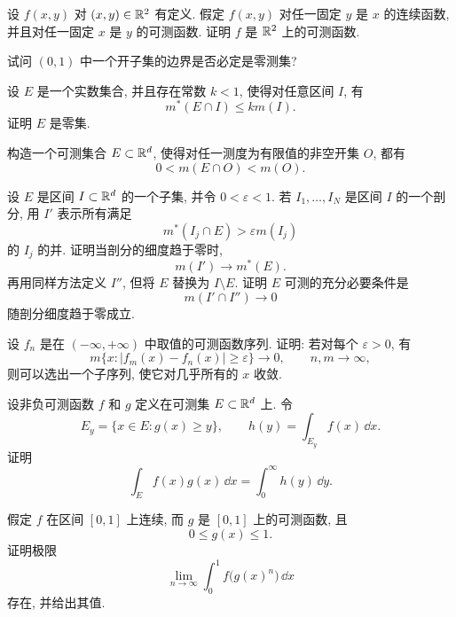 \begin{exer}
	设 \(f(x,y)\) 对 \((x,y)\in\mathbb{R}^2\) 有定义. 假定 \(f(x,y)\) 对任一固定 \(y\) 是 \(x\) 的连续函数, 并且对任一固定 \(x\) 是 \(y\) 的可测函数. 证明 \(f\) 是 \(\mathbb{R}^2\) 上的可测函数.
\end{exer}

\begin{exer}
	试问 \((0,1)\) 中一个开子集的边界是否必定是零测集?
\end{exer}

\begin{exer}
	设 \(E\) 是一个实数集合, 并且存在常数 \(k<1\), 使得对任意区间 \(I\), 有
	\[
	m^*(E\cap I)\leq k m(I).
	\]
	证明 \(E\) 是零集.
\end{exer}

\begin{exer}
	构造一个可测集合 \(E\subset\mathbb{R}^d\), 使得对任一测度为有限值的非空开集 \(O\), 都有
	\[
	0<m(E\cap O)<m(O).
	\]
\end{exer}

\begin{exer}
	设 \(E\) 是区间 \(I\subset\mathbb{R}^d\) 的一个子集, 并令 \(0<\varepsilon<1\). 若 \(I_1,\ldots,I_N\) 是区间 \(I\) 的一个剖分, 用 \(I'\) 表示所有满足
	\[
	m^*(I_j\cap E)>\varepsilon m(I_j)
	\]
	的 \(I_j\) 的并. 证明当剖分的细度趋于零时,
	\[
	m(I')\to m^*(E).
	\]
	再用同样方法定义 \(I''\), 但将 \(E\) 替换为 \(I\setminus E\). 证明 \(E\) 可测的充分必要条件是
	\[
	m(I'\cap I'')\to0
	\]
	随剖分细度趋于零成立.
\end{exer}

\begin{exer}
	设 \(f_n\) 是在 \((-\infty,+\infty)\) 中取值的可测函数序列. 证明: 若对每个 \(\varepsilon>0\), 有
	\[
	m\{x:|f_m(x)-f_n(x)|\geq\varepsilon\}\to0,
	\qquad n,m\to\infty,
	\]
	则可以选出一个子序列, 使它对几乎所有的 \(x\) 收敛.
\end{exer}

\begin{exer}
	设非负可测函数 \(f\) 和 \(g\) 定义在可测集 \(E\subset\mathbb{R}^d\) 上. 令
	\[
	E_y=\{x\in E:g(x)\geq y\},
	\qquad
	h(y)=\int_{E_y}f(x)\,\dd x.
	\]
	证明
	\[
	\int_E f(x)g(x)\,\dd x
	=
	\int_0^{\infty}h(y)\,\dd y.
	\]
\end{exer}

\begin{exer}
	假定 \(f\) 在区间 \([0,1]\) 上连续, 而 \(g\) 是 \([0,1]\) 上的可测函数, 且
	\[
	0\leq g(x)\leq1.
	\]
	证明极限
	\[
	\lim_{n\to\infty}\int_0^1 f\bigl(g(x)^n\bigr)\,\dd x
	\]
	存在, 并给出其值.
\end{exer}

